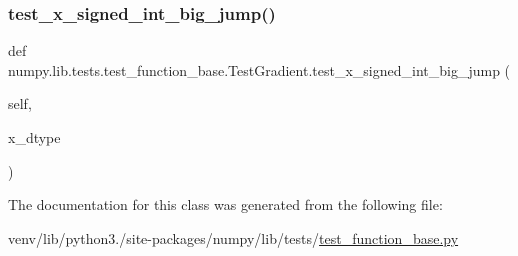 \subsubsection{\texorpdfstring{test\+\_\+x\+\_\+signed\+\_\+int\+\_\+big\+\_\+jump()}{test\_x\_signed\_int\_big\_jump()}}
{\footnotesize\ttfamily def numpy.\+lib.\+tests.\+test\+\_\+function\+\_\+base.\+Test\+Gradient.\+test\+\_\+x\+\_\+signed\+\_\+int\+\_\+big\+\_\+jump (\begin{DoxyParamCaption}\item[{}]{self,  }\item[{}]{x\+\_\+dtype }\end{DoxyParamCaption})}



The documentation for this class was generated from the following file\+:\begin{DoxyCompactItemize}
\item 
venv/lib/python3./site-\/packages/numpy/lib/tests/\hyperlink{lib_2tests_2test__function__base_8py}{test\+\_\+function\+\_\+base.\+py}\end{DoxyCompactItemize}

